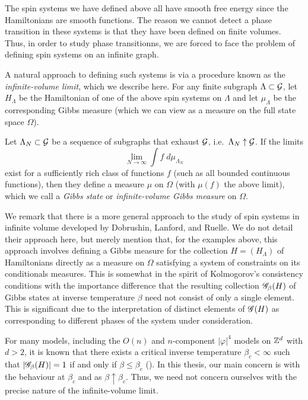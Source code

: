 The spin systems we have defined above all
have smooth free energy since the Hamiltonians are smooth functions. The reason we cannot
detect a phase transition in these systems is that they have been defined on finite volumes.
Thus, in order to study phase transitionns, we are forced to face the problem of defining
spin systems on an infinite graph.

A natural approach to defining such systems is via a procedure known as the
\emph{infinite-volume limit}, which we describe here. For any
finite subgraph $\Lambda \subset \mathcal{G}$, let $H_\Lambda$ be the Hamiltonian
of one of the above spin systems on $\Lambda$ and let $\mu_\Lambda$ be the
corresponding Gibbs measure (which we can view as a measure on the full state
space $\Omega$).

Let $\Lambda_N \subset \mathcal{G}$ be a sequence of subgraphs that exhaust
$\mathcal{G}$, i.e.\ $\Lambda_N \uparrow \mathcal{G}$. If the limits
\begin{equation}
\lim_{N\to\infty} \int f \; d\mu_{\Lambda_N}
\end{equation}
exist for a sufficiently rich class of functions $f$ (such as all bounded continuous functions), then they define a measure $\mu$ on $\Omega$ (with $\mu(f)$ the above limit), which we call a \emph{Gibbs state} or
\emph{infinite-volume Gibbs measure} on $\Omega$.

We remark that there is a more general approach to the study of spin systems in infinite volume developed by Dobrushin, Lanford, and Ruelle. We do not detail their approach here, but merely mention that, for the examples above, this approach involves defining a Gibbs measure for the collection
$H = (H_\Lambda)$ of Hamiltonians directly as a measure on $\Omega$ satisfying a system of constraints on its conditionals measures. This is somewhat in the spirit of Kolmogorov's consistency conditions with the importance difference that the resulting collection $\mathscr{G}_\beta(H)$ of Gibbs states at inverse temperature
$\beta$ need not consist of only a single element. This is significant due to the interpretation of distinct elements of $\mathscr{G}(H)$ as corresponding to different phases of the system under consideration.

For many models, including the $O(n)$ and $n$-component $|\varphi|^4$ models on ${ {{\mathbb Z}}^d }$ with $d > 2$, it is known that there exists a critical inverse temperature $\beta_c < \infty$ such that
$|\mathscr{G}_\beta(H)| = 1$ if and only if $\beta \le \beta_c$ (\REF). In this thesis, our main concern is with the behaviour at $\beta_c$ and as
$\beta \uparrow \beta_c$. Thus, we need not concern ourselves with the precise nature of the infinite-volume limit.

